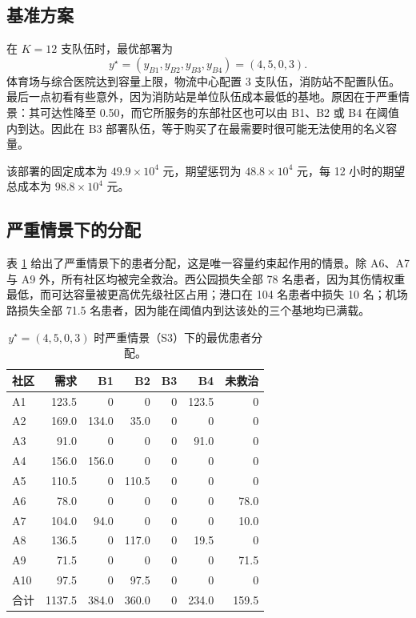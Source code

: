 \documentclass[12pt,a4paper,fontset=windows]{ctexart}
\begin{document}
\subsection{基准方案}

在 $K=12$ 支队伍时，最优部署为
\[
y^{\star}=(y_{B1},y_{B2},y_{B3},y_{B4})=(4,5,0,3).
\]
体育场与综合医院达到容量上限，物流中心配置 3 支队伍，消防站不配置队伍。最后一点初看有些意外，因为消防站是单位队伍成本最低的基地。原因在于严重情景：其可达性降至 0.50，而它所服务的东部社区也可以由 B1、B2 或 B4 在阈值内到达。因此在 B3 部署队伍，等于购买了在最需要时很可能无法使用的名义容量。

该部署的固定成本为 $49.9\times10^{4}$ 元，期望惩罚为 $48.8\times10^{4}$ 元，每 12 小时的期望总成本为 $98.8\times10^{4}$ 元。

\subsection{严重情景下的分配}

表 \ref{tab:alloc} 给出了严重情景下的患者分配，这是唯一容量约束起作用的情景。除 A6、A7 与 A9 外，所有社区均被完全救治。西公园损失全部 78 名患者，因为其伤情权重最低，而可达容量被更高优先级社区占用；港口在 104 名患者中损失 10 名；机场路损失全部 71.5 名患者，因为能在阈值内到达该处的三个基地均已满载。

\begin{table}[!ht]
\centering
\caption{$y^{\star}=(4,5,0,3)$ 时严重情景（S3）下的最优患者分配。}
\label{tab:alloc}
\small
\begin{tabular}{lrrrrrr}
\toprule
社区 & 需求 & B1 & B2 & B3 & B4 & 未救治 \\
\midrule
A1  & 123.5 & 0    & 0    & 0 & 123.5 & 0 \\
A2  & 169.0 & 134.0 & 35.0 & 0 & 0   & 0 \\
A3  & 91.0  & 0    & 0    & 0 & 91.0  & 0 \\
A4  & 156.0 & 156.0 & 0   & 0 & 0     & 0 \\
A5  & 110.5 & 0    & 110.5 & 0 & 0   & 0 \\
A6  & 78.0  & 0    & 0    & 0 & 0     & 78.0 \\
A7  & 104.0 & 94.0 & 0    & 0 & 0     & 10.0 \\
A8  & 136.5 & 0    & 117.0 & 0 & 19.5 & 0 \\
A9  & 71.5  & 0    & 0    & 0 & 0     & 71.5 \\
A10 & 97.5  & 0    & 97.5 & 0 & 0     & 0 \\
\midrule
合计 & 1137.5 & 384.0 & 360.0 & 0 & 234.0 & 159.5 \\
\bottomrule
\end{tabular}
\end{table}
\end{document}
